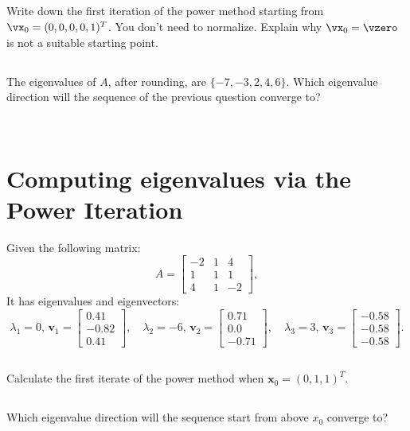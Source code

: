 \documentclass{article}%
\begin{document}
\subsection{}
Write down the first iteration of the power method starting from $\vx_0 = (0,0,0,0,1)^T$.
You don't need to normalize.
Explain why $\vx_0 = \vzero$ is not a suitable starting point.

\subsection{}
The eigenvalues of $A$, after rounding, are $\{-7, -3, 2, 4, 6\}$.
Which eigenvalue direction will the sequence of the previous question converge to?

\

\section{Computing eigenvalues via the Power Iteration}
Given the following matrix:
\[
A=\begin{bmatrix}
-2 & 1 & 4  \\ 1 & 1 & 1 \\ 4 & 1 & -2 \end{bmatrix},
\]
It has eigenvalues and eigenvectors:
\[
\lambda_1=0,
\, {\boldsymbol v_1}
=\begin{bmatrix}
0.41  \\ -0.82 \\ 0.41 \end{bmatrix},\quad
\lambda_2=-6,
\,{\boldsymbol v_2}
=\begin{bmatrix}
0.71  \\ 0.0 \\ -0.71 \end{bmatrix},\quad
\lambda_3=3, \,{\boldsymbol v_3}
=\begin{bmatrix}
-0.58  \\ -0.58 \\ -0.58 \end{bmatrix}.
\]

\subsection{}\label{sec:1.a}
Calculate the first iterate of the power method when ${\boldsymbol x_0}=(0,1,1)^T$.

\subsection{}
Which eigenvalue direction will the sequence start from above $x_0$ converge to?
  
\end{document}
